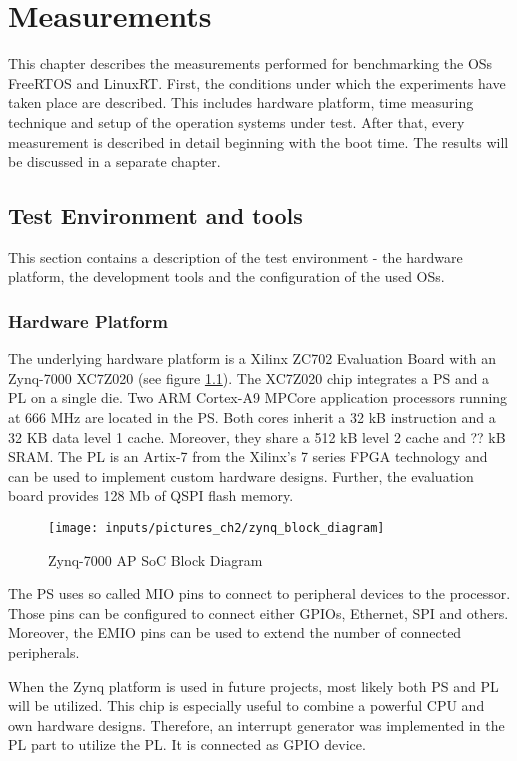 \chapter{Measurements}\label{ch_measurements}
This chapter describes the measurements performed for benchmarking the \acp{OS} FreeRTOS and LinuxRT.
First, the conditions under which the experiments have taken place are described.
This includes hardware platform, time measuring technique and setup of the operation systems under test.
After that, every measurement is described in detail beginning with the boot time.
The results will be discussed in a separate chapter.

\section{Test Environment and tools}
This section contains a description of the test environment - the hardware platform, the development tools and the configuration of the used \acp{OS}.
\subsection{Hardware Platform}
The underlying hardware platform is a Xilinx ZC702 Evaluation Board \cite{xilinx:zc702_ev_board} with an Zynq-7000 XC7Z020 \cite{xilinx:zynq7000} (see figure \ref{fig_zynq_block_diagram}).
The XC7Z020 chip integrates a \ac{PS} and a \ac{PL} on a single die.
Two ARM Cortex-A9 MPCore application processors running at 666 MHz are located in the \ac{PS}.
Both cores inherit a 32 kB instruction and a 32 KB data level 1 cache.
Moreover, they share a 512 kB level 2 cache and ?? kB SRAM.
The \ac{PL} is an Artix-7 from the Xilinx's 7 series \ac{FPGA} technology and can be used to implement custom hardware designs.
Further, the evaluation board provides 128 Mb of \ac{QSPI} flash memory.

\begin{figure}[htb]
		\begin{center}
			\texttt{[image: inputs/pictures\_ch2/zynq\_block\_diagram]}
			\caption[Zynq-7000 AP SoC Block Diagram]{Zynq-7000 AP SoC Block Diagram \cite{xilinx:zc702_ev_board}} \label{fig_zynq_block_diagram}
		\end{center}
\end{figure} 

The \ac{PS} uses so called \ac{MIO} pins to connect to peripheral devices to the processor.
Those pins can be configured to connect either \acp{GPIO}, Ethernet, \ac{SPI} and others.
Moreover, the \ac{EMIO} pins can be used to extend the number of connected peripherals.
\par
When the Zynq platform is used in future projects, most likely both \ac{PS} and \ac{PL} will be utilized.
This chip is especially useful to combine a powerful \ac{CPU} and own hardware designs.
Therefore, an interrupt generator was implemented in the \ac{PL} part to utilize the \ac{PL}.
It is connected as \ac{GPIO} device.

